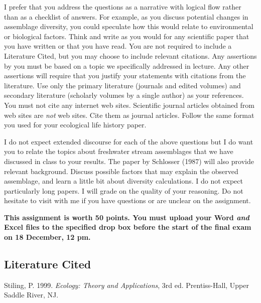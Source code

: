 \documentclass[11pt]{article}
\begin{document}
I prefer that you address the questions as a narrative with logical flow rather than as a checklist of answers.  For example, as you discuss potential changes in assemblage diversity, you could speculate how this would relate to environmental or biological factors.  Think and write as you would for any scientific paper that you have written or that you have read.  You are not required to include a Literature Cited, but you may choose to include relevant citations.  Any assertions by you must be based on a topic we specifically addressed in lecture.  Any other assertions will require that you justify your statements with citations from the literature.  Use only the primary literature (journals and edited volumes) and secondary literature (scholarly volumes by a single author) as your references.  You must not cite any internet web sites.  Scientific journal articles obtained from web sites are \emph{not} web sites. Cite them as journal articles. Follow the same format you used for your ecological life history paper.

I do not expect extended discourse for each of the above questions but I do want you to relate the topics about freshwater stream assemblages that we have discussed in class to your results.  The paper by Schlosser (1987) will also provide relevant background.  Discuss possible factors that may explain the observed assemblage, and learn a little bit about diversity calculations.  I do not expect particularly long papers.  I will  grade on the quality of your reasoning. Do not hesitate to visit with me if you have questions or are unclear on the assignment. 

\textbf{This assignment is worth 50 points. You must upload your Word \emph{and} Excel files to the specified drop box before the start of the final exam on 18 December, 12 pm.}

\subsection*{Literature Cited}

Stiling, P. 1999. \textit{Ecology: Theory and Applications}, 3rd ed. Prentiss-Hall, Upper Saddle River, NJ.
\end{document}
